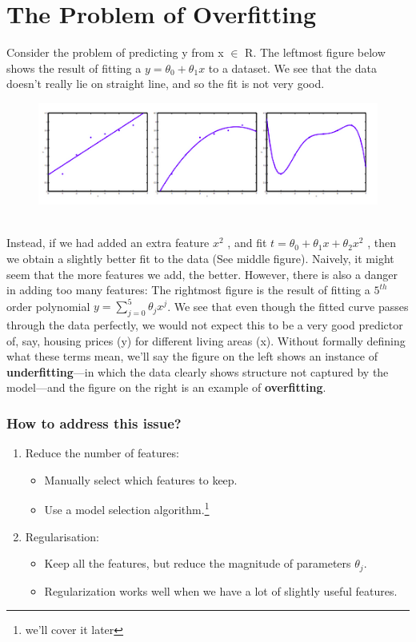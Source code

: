 \documentclass[12pt]{report}
\begin{document}
\section{The Problem of Overfitting}
  Consider the problem of predicting y from x $\in$ R. The leftmost figure below shows the result of fitting a $y = \theta_0+\theta_1x$ to a dataset. We see that the data doesn’t really lie on straight line, and so the fit is not very good.\\ 
  \begin{figure}[h]
    \centering
    \includegraphics[scale=0.5]{overfitting.png}
  \end{figure}
  \\
  Instead, if we had added an extra feature $x^2$ , and fit $ t = \theta_0 + \theta_1x + \theta_2x^2$ , then we obtain a slightly better fit to the data (See middle figure). Naively, it might seem that the more features we add, the better. However, there is also a danger in adding too many features: The rightmost figure is the result of fitting a $5^{th}$ order polynomial $y = \sum_{j=0} ^5 \theta_j x^j$. We see that even though the fitted curve passes through the data perfectly, we would not expect this to be a very good predictor of, say, housing prices (y) for different living areas (x). Without formally defining what these terms mean, we’ll say the figure on the left shows an instance of \textbf{underfitting}—in which the data clearly shows structure not captured by the model—and the figure on the right is an example of \textbf{overfitting}.

    \subsubsection{How to address this issue?}
      \begin{enumerate}
        \item Reduce the number of features:
        \begin{itemize}
          \item Manually select which features to keep.
          \item Use a model selection algorithm.\footnote[2]{we'll cover it later}
        \end{itemize}
        \item Regularisation:
        \begin{itemize}
          \item Keep all the features, but reduce the magnitude of parameters $\theta_j$.
          \item Regularization works well when we have a lot of slightly useful features.
        \end{itemize}
      \end{enumerate}
\end{document}
